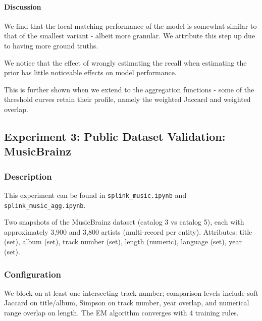 \paragraph{Discussion}
We find that the local matching performance of the model is somewhat similar to that of the smallest variant - albeit more granular. We attribute this step up due to having more ground truths.

We notice that the effect of wrongly estimating the recall when estimating the prior has little
noticeable effects on model performance.

This is further shown when we extend to the aggregation functions - some of the threshold curves
retain their profile, namely the weighted Jaccard and weighted overlap.

\subsection{Experiment 3: Public Dataset Validation: MusicBrainz}
\label{sec:exp_musicbrainz}
\subsubsection{Description}
This experiment can be found in \texttt{splink\_music.ipynb} and \texttt{splink\_music\_agg.ipynb}.

Two snapshots of the MusicBrainz dataset (catalog 3 vs catalog 5), each with approximately 3,900 and 3,800 artists (multi-record per entity). Attributes: title (set), album (set), track number (set), length (numeric), language (set), year (set).
\subsubsection{Configuration}
We block on at least one intersecting track number; comparison levels include soft Jaccard on title/album, Simpson on track number, year overlap, and numerical range overlap on length. The EM algorithm converges with 4 training rules.

